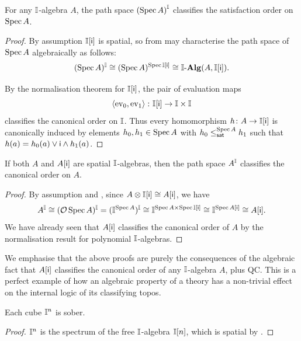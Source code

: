 \begin{theorem}[\AxiomSQCP]\label{thm:phoa-spectrum}
  For any $\mathbb{I}$-algebra $A$, the path space ${(\operatorname{Spec} A)}^{\mathbb{I}}$ classifies the satisfaction order on $\operatorname{Spec} A$.
\end{theorem}
\begin{proof}
  By assumption $\mathbb{I}[\mathsf{i}]$ is spatial, so from  may characterise the path space of $\operatorname{Spec}{A}$ algebraically as follows:
  \[ (\operatorname{Spec} A)^{\mathbb{I}} \cong (\operatorname{Spec}{A})^{\operatorname{Spec}{\mathbb{I}[\mathsf{i}]}}\cong \mathbb{I}\text{-}\mathbf{Alg}(A,\mathbb{I}[\mathsf{i}])\text{.} \]
  
  By the normalisation theorem for $\mathbb{I}[\mathsf{i}]$, the pair of evaluation maps
  \[ \left\langle\mathrm{ev}_0,\mathrm{ev}_1\right\rangle \colon \mathbb{I}[\mathsf{i}] \to \mathbb{I} \times \mathbb{I} \]
  classifies the canonical order on $\mathbb{I}$.
  Thus every homomorphism $h\colon A\to \mathbb{I}[\mathsf{i}]$ is canonically induced by elements $h_0,h_1\in\operatorname{Spec}{A}$ with $h_0\satle[\spec{A}] h_1$ such that $h(a) = h_0(a) \vee \mathsf{i} \wedge h_1(a)$.
\end{proof}


\begin{theorem}[\AxiomSQCP]\label{thm:algebraphoa}
  If both $A$ and $A[\mathsf{i}]$ are spatial $\mathbb{I}$-algebras, then the path space $A^{\mathbb{I}}$ classifies the canonical order on $A$.
\end{theorem}
\begin{proof}
  By assumption and , since $A \otimes \mathbb{I}[\mathsf{i}] \cong A[\mathsf{i}]$, we have
  \[ A^{\mathbb{I}} \cong (\mathcal{O}\operatorname{Spec} A)^{\mathbb{I}} = (\mathbb{I}^{\operatorname{Spec} A})^{\mathbb{I}} \cong \mathbb{I}^{\operatorname{Spec} A \times \operatorname{Spec}\mathbb{I}[\mathsf{i}]} \cong \mathbb{I}^{\operatorname{Spec} A[\mathsf{i}]} \cong A[\mathsf{i}]\text{.} \]
  We have already seen that $A[\mathsf{i}]$ classifies the canonical order of $A$ by the normalisation result for polynomial $\mathbb{I}$-algebras.
\end{proof}

\begin{remark}\label{rem:normalalgebra}
  We emphasise that the above proofs are purely the consequences of the algebraic fact that $A[\mathsf{i}]$ classifies the canonical order of any $\mathbb{I}$-algebra $A$, plus \gls{QC}. This is a perfect example of how an algebraic property of a theory has a non-trivial effect on the internal logic of its classifying topos.
\end{remark}

\begin{corollary}[\AxiomSQCP]\label{lem:cubes-are-sober}
  Each cube $\mathbb{I}^n$ is sober.
\end{corollary}
\begin{proof}
  $\mathbb{I}^n$ is the spectrum of the free $\mathbb{I}$-algebra $\mathbb{I}[n]$, which is spatial by .
\end{proof}

